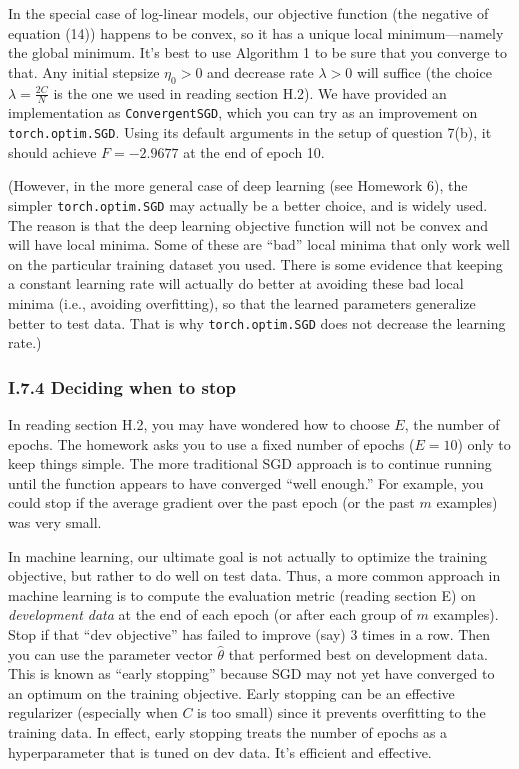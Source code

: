 In the special case of log-linear models, our objective function (the negative of equation (14)) happens to be convex, so it has a unique local minimum—namely the global minimum. It’s best to use Algorithm 1 to be sure that you converge to that. Any initial stepsize $\eta_0 > 0$ and decrease rate $\lambda > 0$ will suffice (the choice $\lambda = \tfrac{2C}{N}$ is the one we used in reading section H.2). We have provided an implementation as \texttt{ConvergentSGD}, which you can try as an improvement on \texttt{torch.optim.SGD}. Using its default arguments in the setup of question 7(b), it should achieve $F = -2.9677$ at the end of epoch 10.

(However, in the more general case of deep learning (see Homework 6), the simpler \texttt{torch.optim.SGD} may actually be a better choice, and is widely used. The reason is that the deep learning objective function will not be convex and will have local minima. Some of these are “bad” local minima that only work well on the particular training dataset you used. There is some evidence that keeping a constant learning rate will actually do better at avoiding these bad local minima (i.e., avoiding overfitting), so that the learned parameters generalize better to test data. That is why \texttt{torch.optim.SGD} does not decrease the learning rate.)

\subsubsection*{I.7.4 Deciding when to stop}

In reading section H.2, you may have wondered how to choose $E$, the number of epochs. The homework asks you to use a fixed number of epochs ($E=10$) only to keep things simple. The more traditional SGD approach is to continue running until the function appears to have converged “well enough.” For example, you could stop if the average gradient over the past epoch (or the past $m$ examples) was very small.

In machine learning, our ultimate goal is not actually to optimize the training objective, but rather to do well on test data. Thus, a more common approach in machine learning is to compute the evaluation metric (reading section E) on \emph{development data} at the end of each epoch (or after each group of $m$ examples). Stop if that “dev objective” has failed to improve (say) 3 times in a row. Then you can use the parameter vector $\hat{\theta}$ that performed best on development data. This is known as “early stopping” because SGD may not yet have converged to an optimum on the training objective. Early stopping can be an effective regularizer (especially when $C$ is too small) since it prevents overfitting to the training data. In effect, early stopping treats the number of epochs as a hyperparameter that is tuned on dev data. It’s efficient and effective.


